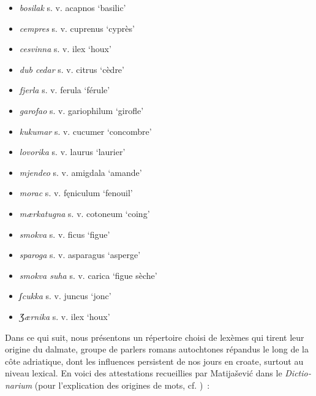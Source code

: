 \documentclass[output=paper,colorlinks,citecolor=brown,arabicfont,chinesefont,booklanguage=french]{langscibook}
\begin{document}
\begin{otherlanguage}{french}
\begin{itemize}
    \item \emph{bosilak} s. v. acapnos ‘basilic’
    \item \emph{cempres} s. v. cuprenus ‘cyprès’
    \item \emph{cesvinna} s. v. ilex ‘houx’
    \item \emph{dub cedar} s. v.  citrus ‘cèdre’
    \item \emph{fjerla} s. v. ferula ‘férule’
    \item \emph{garofao} s. v. gariophilum ‘girofle’
    \item \emph{kukumar} s. v. cucumer ‘concombre’
    \item \emph{lovorika} s. v. laurus ‘laurier’
    \item \emph{mjendeo} s. v. amigdala ‘amande’
    \item \emph{morac} s. v. fęniculum ‘fenouil’
    \item \emph{mærkatugna} s. v. cotoneum ‘coing’
    \item \emph{smokva} s. v. ficus ‘figue’
    \item \emph{sparoga} s. v. asparagus ‘asperge’
    \item \emph{smokva suha} s. v. carica ‘figue sèche’
    \item \emph{ʃcukka} s. v. juncus ‘jonc’
    \item \emph{Ʒærnika} s. v. ilex ‘houx’
\end{itemize}

Dans ce qui suit, nous présentons un répertoire choisi de lexèmes qui tirent leur origine du dalmate, groupe de parlers romans autochtones répandus le long de la côte adriatique, dont les influences persistent de nos jours en croate, surtout au niveau lexical. En voici des attestations recueillies par Matijašević dans le \emph{Dictionarium} (pour l’explication des origines de mots, cf. \citealt[146]{Franic2014})~:


\end{otherlanguage}
\end{document}
